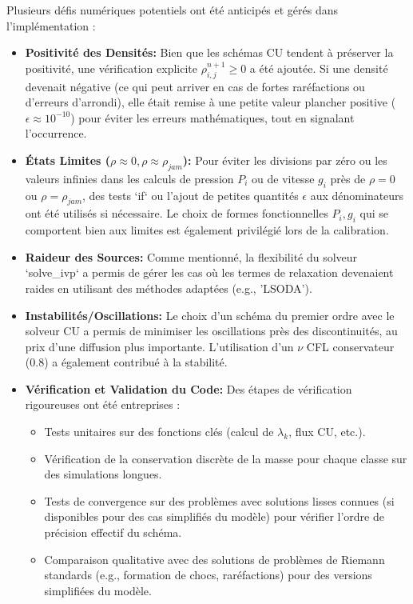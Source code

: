 Plusieurs défis numériques potentiels ont été anticipés et gérés dans l'implémentation :
\begin{itemize}
    \item \textbf{Positivité des Densités:} Bien que les schémas CU tendent à préserver la positivité, une vérification explicite \( \rho_{i,j}^{n+1} \ge 0 \) a été ajoutée. Si une densité devenait négative (ce qui peut arriver en cas de fortes raréfactions ou d'erreurs d'arrondi), elle était remise à une petite valeur plancher positive (\(\epsilon \approx 10^{-10}\)) pour éviter les erreurs mathématiques, tout en signalant l'occurrence.
    \item \textbf{États Limites (\(\rho \approx 0, \rho \approx \rho_{jam}\)):} Pour éviter les divisions par zéro ou les valeurs infinies dans les calculs de pression \( P_i \) ou de vitesse \( g_i \) près de \(\rho=0\) ou \(\rho=\rho_{jam}\), des tests `if` ou l'ajout de petites quantités \(\epsilon\) aux dénominateurs ont été utilisés si nécessaire. Le choix de formes fonctionnelles \( P_i, g_i \) qui se comportent bien aux limites est également privilégié lors de la calibration.
    \item \textbf{Raideur des Sources:} Comme mentionné, la flexibilité du solveur `solve\_ivp` a permis de gérer les cas où les termes de relaxation devenaient raides en utilisant des méthodes adaptées (e.g., 'LSODA').
    \item \textbf{Instabilités/Oscillations:} Le choix d'un schéma du premier ordre avec le solveur CU a permis de minimiser les oscillations près des discontinuités, au prix d'une diffusion plus importante. L'utilisation d'un \(\nu\) CFL conservateur (0.8) a également contribué à la stabilité.
    \item \textbf{Vérification et Validation du Code:} Des étapes de vérification rigoureuses ont été entreprises :
        \begin{itemize}
            \item Tests unitaires sur des fonctions clés (calcul de \( \lambda_k \), flux CU, etc.).
            \item Vérification de la conservation discrète de la masse pour chaque classe sur des simulations longues.
            \item Tests de convergence sur des problèmes avec solutions lisses connues (si disponibles pour des cas simplifiés du modèle) pour vérifier l'ordre de précision effectif du schéma.
            \item Comparaison qualitative avec des solutions de problèmes de Riemann standards (e.g., formation de chocs, raréfactions) pour des versions simplifiées du modèle.
        \end{itemize}
\end{itemize}

